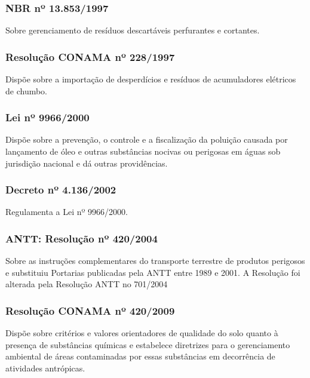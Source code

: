 \begin{subapend}
\begin{subsubapend}
		\subsubsection{NBR nº 13.853/1997}
		Sobre gerenciamento de resíduos descartáveis perfurantes e cortantes.
		
		\subsubsection{Resolução CONAMA nº 228/1997}
		Dispõe sobre a importação de desperdícios e resíduos de acumuladores elétricos de chumbo.
		
		\subsubsection{Lei nº 9966/2000}
		Dispõe sobre a prevenção, o controle e a fiscalização da poluição causada por lançamento de óleo e outras substâncias nocivas ou perigosas em águas sob jurisdição nacional e dá outras providências.
		
		\subsubsection{Decreto nº 4.136/2002}
		Regulamenta a Lei nº 9966/2000.
	
		
		\subsubsection{ANTT: Resolução nº 420/2004}
		Sobre as instruções complementares do transporte terrestre de produtos perigosos e substituiu Portarias publicadas pela ANTT entre 1989 e 2001. A Resolução foi alterada pela Resolução ANTT no 701/2004
		
		\subsubsection{Resolução CONAMA nº 420/2009}
		Dispõe sobre critérios e valores orientadores de qualidade do solo quanto à presença de substâncias químicas e estabelece diretrizes para o gerenciamento ambiental de áreas contaminadas por essas substâncias em decorrência de atividades antrópicas.
	

\end{subsubapend}
\end{subapend}
